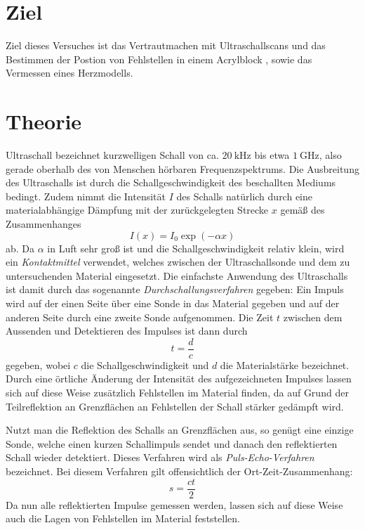 \section{Ziel}
\label{sec:ziel}
Ziel dieses Versuches ist das Vertrautmachen mit Ultraschallscans und das
Bestimmen der Postion von Fehlstellen in einem Acrylblock , sowie das Vermessen eines Herzmodells.


\section{Theorie}
\label{sec:Theorie}

Ultraschall bezeichnet kurzwelligen Schall von ca. $\SI{20}{\kilo \hertz}$ bis
etwa $\SI{1}{\giga \hertz}$, also gerade oberhalb des von Menschen hörbaren
Frequenzspektrums.
Die Ausbreitung des Ultraschalls ist durch die Schallgeschwindigkeit
des beschallten Mediums bedingt. Zudem nimmt die Intensität $I$ des Schalls
natürlich durch eine materialabhängige Dämpfung mit der zurückgelegten Strecke
$x$ gemäß des Zusammenhanges
\begin{equation}
  I(x) = I_0 \exp(-\alpha x)
  \label{eqn:I}
\end{equation}
ab. Da $\alpha$ in Luft sehr groß ist und die Schallgeschwindigkeit relativ klein,
wird ein \textit{Kontaktmittel} verwendet, welches zwischen der Ultraschallsonde
und dem zu untersuchenden Material eingesetzt.
Die einfachste Anwendung des Ultraschalls ist damit durch das
sogenannte \textit{Durchschallungsverfahren} gegeben: Ein Impuls wird auf der
einen Seite über eine Sonde in das Material gegeben und auf der anderen Seite
durch eine zweite Sonde aufgenommen. Die Zeit $t$ zwischen dem Aussenden und
Detektieren des Impulses ist dann durch
\begin{equation}
  t = \frac{d}{c}
  \label{eqn:durch}
\end{equation}
gegeben, wobei $c$ die Schallgeschwindigkeit und $d$ die Materialstärke bezeichnet.
Durch eine örtliche Änderung der Intensität des aufgezeichneten Impulses lassen
sich auf diese Weise zusätzlich Fehlstellen im Material finden, da auf Grund der
Teilreflektion an Grenzflächen an Fehlstellen der Schall stärker gedämpft wird.

Nutzt man die Reflektion des Schalls an Grenzflächen aus, so genügt eine einzige
Sonde, welche einen kurzen Schallimpuls sendet und danach den reflektierten
Schall wieder detektiert. Dieses Verfahren wird als \textit{Puls-Echo-Verfahren}
bezeichnet. Bei diesem Verfahren gilt offensichtlich der Ort-Zeit-Zusammenhang:
\begin{equation}
  s = \frac{ct}{2}
  \label{eqn:echo}
\end{equation}
Da nun alle reflektierten Impulse gemessen werden, lassen sich auf diese Weise
auch die Lagen von Fehlstellen im Material feststellen.

